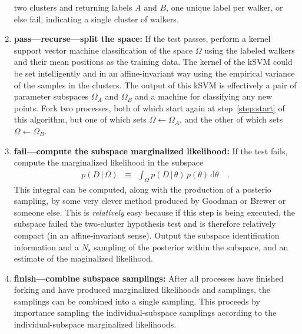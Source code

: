 \documentclass[12pt]{article}
\newcommand{\given}{\,|\,}
\newcommand{\dd}{\mathrm{d}}
\newcommand{\data}{D}
\newcommand{\pars}{\theta}
\newcommand{\parspace}{\Omega}
\newcommand{\nsample}{N_{\mathrm{s}}}
\begin{document}
\begin{enumerate}
  two clusters and returning labels $A$ and $B$, one unique label per
  walker, or else fail, indicating a single cluster of walkers.
\item \textbf{pass---recurse---split the space:} If the test passes,
  perform a kernel support vector machine classification of the space
  $\parspace$ using the labeled walkers and their mean positions as
  the training data.  The kernel of the kSVM could be set
  intelligently and in an affine-invariant way using the empirical
  variance of the samples in the clusters.  The output of this kSVM is
  effectively a pair of parameter subspaces $\parspace_A$ and
  $\parspace_B$ and a machine for classifying any new points.  Fork
  two processes, both of which start again at step~\ref{step:start} of
  this algorithm, but one of which sets
  $\parspace\leftarrow\parspace_A$, and the other of which sets
  $\parspace\leftarrow\parspace_B$.
\item \textbf{fail---compute the subspace marginalized likelihood:} If
  the test fails, compute the marginalized likelihood in the subspace
  \begin{eqnarray}
    p(\data\given\parspace)
    &\equiv&
    \int_\parspace p(\data\given\pars)\,p(\pars)\,\dd\pars
    \quad .
  \end{eqnarray}
  This integral can be computed, along with the production of a
  posterio sampling, by some very clever method produced by Goodman or
  Brewer or someone else.  This is \emph{relatively} easy because if
  this step is being executed, the subspace failed the two-cluster
  hypothesis test and is therefore relatively compact (in an
  affine-invariant sense).  Output the subspace identification
  information and a $\nsample$ sampling of the posterior within the
  subspace, and an estimate of the maginalized likelihood.
\item \textbf{finish---combine subspace samplings:} After all
  processes have finished forking and have produced marginalized
  likelihoods and samplings, the samplings can be combined into a
  single sampling.  This proceeds by importance sampling the
  individual-subspace samplings according to the individual-subspace
  marginalized likelihoods.
\end{enumerate}
\end{document}
